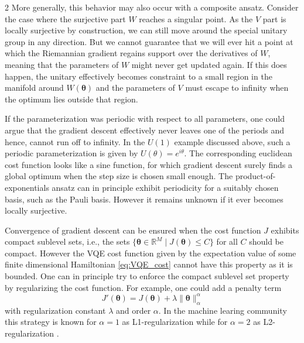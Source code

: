 \documentclass{article}
\renewcommand{\vec}[1]{\ensuremath{\boldsymbol{#1}}}
\begin{document}
\begin{multicols}{2}
More generally, this behavior may also occur with a composite ansatz. Consider the case where the surjective part \(W\) reaches a singular point.
As the \(V\) part is locally surjective by construction, we can still move around the special unitary group in any direction. But we cannot guarantee that we will ever hit a point at which the Riemannian gradient regains support over the derivatives of \(W\), meaning that the parameters of \(W\) might never get updated again. If this does happen, the unitary effectively becomes constraint to a small region in the manifold around \(W(\vec{\theta})\) and the parameters of \(V\) must escape to infinity when the optimum lies outside that region.

If the parameterization was periodic with respect to all parameters, one could argue that the gradient descent effectively never leaves one of the periods and hence, cannot run off to infinity.
In the \(U(1)\) example discussed above, such a periodic parameterization is given by $U(\theta) = e^{i \theta}$.
The corresponding euclidean cost function looks like a sine function, for which  gradient descent surely finds a global optimum when the step size is chosen small enough. The product-of-exponentials ansatz can in principle
exhibit periodicity for a suitably chosen basis, such as the Pauli basis. However it remains unknown if it ever becomes locally surjective.

Convergence of gradient descent can be ensured when the cost function $J$ exhibits compact sublevel sets, i.e., the sets \(\{\vec{\theta} \in \mathds{R}^M \mid J(\vec{\theta}) \leq C\}\) for all $C$ should be compact.
However the VQE cost function given by the expectation value of some finite dimensional Hamiltonian \eqref{eq:VQE_cost} cannot have this property as it is bounded.
One can in principle try to enforce the compact sublevel set property by regularizing the cost function.
For example, one could add a penalty term
\begin{equation}
    J'(\vec{\theta}) = J(\vec{\theta}) + \lambda \lVert \vec{\theta} \rVert_\alpha^\alpha
\end{equation}
with regularization constant \(\lambda\) and order \(\alpha\).
In the machine learing community this strategy is known for \(\alpha = 1\) as L1-regularization while for \(\alpha = 2\) as L2-regularization  \cite{moradi_survey_2020}.


\end{multicols}
\end{document}
